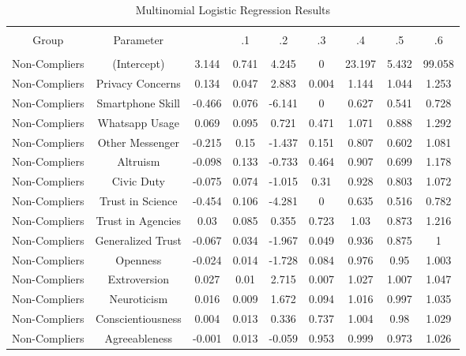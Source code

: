 
\begin{table}[!htbp] \centering 
  \caption{Multinomial Logistic Regression Results} 
  \label{} 
\begin{tabular}{@{\extracolsep{5pt}} ccccccccc} 
\\[-1.8ex]\hline 
\hline \\[-1.8ex] 
Group & Parameter &  & .1 & .2 & .3 & .4 & .5 & .6 \\ 
\hline \\[-1.8ex] 
Non-Compliers & (Intercept) & 3.144 & 0.741 & 4.245 & 0 & 23.197 & 5.432 & 99.058 \\ 
Non-Compliers & Privacy Concerns & 0.134 & 0.047 & 2.883 & 0.004 & 1.144 & 1.044 & 1.253 \\ 
Non-Compliers & Smartphone Skill & -0.466 & 0.076 & -6.141 & 0 & 0.627 & 0.541 & 0.728 \\ 
Non-Compliers & Whatsapp Usage & 0.069 & 0.095 & 0.721 & 0.471 & 1.071 & 0.888 & 1.292 \\ 
Non-Compliers & Other Messenger & -0.215 & 0.15 & -1.437 & 0.151 & 0.807 & 0.602 & 1.081 \\ 
Non-Compliers & Altruism & -0.098 & 0.133 & -0.733 & 0.464 & 0.907 & 0.699 & 1.178 \\ 
Non-Compliers & Civic Duty & -0.075 & 0.074 & -1.015 & 0.31 & 0.928 & 0.803 & 1.072 \\ 
Non-Compliers & Trust in Science & -0.454 & 0.106 & -4.281 & 0 & 0.635 & 0.516 & 0.782 \\ 
Non-Compliers & Trust in Agencies & 0.03 & 0.085 & 0.355 & 0.723 & 1.03 & 0.873 & 1.216 \\ 
Non-Compliers & Generalized Trust & -0.067 & 0.034 & -1.967 & 0.049 & 0.936 & 0.875 & 1 \\ 
Non-Compliers & Openness & -0.024 & 0.014 & -1.728 & 0.084 & 0.976 & 0.95 & 1.003 \\ 
Non-Compliers & Extroversion & 0.027 & 0.01 & 2.715 & 0.007 & 1.027 & 1.007 & 1.047 \\ 
Non-Compliers & Neuroticism & 0.016 & 0.009 & 1.672 & 0.094 & 1.016 & 0.997 & 1.035 \\ 
Non-Compliers & Conscientiousness & 0.004 & 0.013 & 0.336 & 0.737 & 1.004 & 0.98 & 1.029 \\ 
Non-Compliers & Agreeableness & -0.001 & 0.013 & -0.059 & 0.953 & 0.999 & 0.973 & 1.026 \\ 

\end{tabular}
\end{table}
